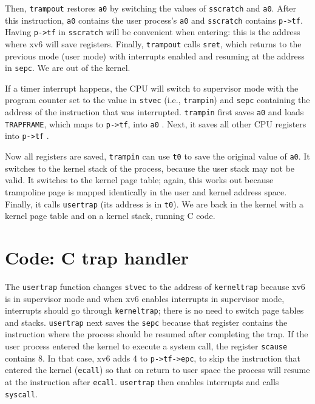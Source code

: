 Then, \lstinline{trampout} restores \lstinline{a0} by switching the
values of \lstinline{sscratch} and \lstinline{a0}. After this
instruction, \lstinline{a0} contains the user process's \lstinline{a0}
and \lstinline{sscratch} contains \lstinline{p->tf}.  Having
\lstinline{p->tf} in \lstinline{sscratch} will be convenient when
entering: this is the address where xv6 will save registers.  Finally,
\lstinline{trampout} calls \lstinline{sret}, which returns to the
previous mode (user mode) with interrupts enabled and resuming at the
address in \lstinline{sepc}.  We are out of the kernel.

If a timer interrupt happens, the CPU will switch to supervisor mode with
the program counter set to the value in \lstinline{stvec} (i.e.,
\lstinline{trampin}) and \lstinline{sepc} containing the address of
the instruction that was interrupted.  \lstinline{trampin} first saves
\lstinline{a0} and loads \lstinline{TRAPFRAME}, which maps to
\lstinline{p->tf}, into \lstinline{a0}
.
Next, it saves all other
CPU registers into \lstinline{p->tf}
.

Now all registers are saved, \lstinline{trampin} can
use \lstinline{t0} to save the original value of \lstinline{a0}.  It
switches to the kernel stack of the process, because the user stack
may not be valid.  It switches to the kernel page table; again, this
works out because trampoline page is mapped identically in the user
and kernel address space.  Finally, it calls \lstinline{usertrap} (its
address is in \lstinline{t0}).  We are back in the kernel with a
kernel page table and on a kernel stack, running C code.

\section{Code: C trap handler}

The \lstinline{usertrap} function changes \lstinline{stvec} to the
address of \lstinline{kerneltrap} because xv6 is in supervisor mode and
when xv6 enables interrupts in supervisor mode, interrupts should go
through \lstinline{kerneltrap}; there is no need to switch page tables
and stacks. \lstinline{usertrap} next saves the \lstinline{sepc}
because that register contains the instruction where the process
should be resumed after completing the trap.
If the user process entered the kernel to execute a system
call, the register \lstinline{scause} contains 8.  In that case, xv6
adds 4 to \lstinline{p->tf->epc}, to skip the instruction that entered
the kernel (\lstinline{ecall}) so that on return to user space the
process will resume at the instruction after \lstinline{ecall}.
\lstinline{usertrap} then enables interrupts and calls
\lstinline{syscall}.

